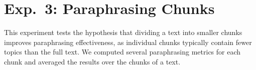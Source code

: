\section{Exp.\ 3: Paraphrasing Chunks}
\label{sec:results_chunks}

This experiment tests the hypothesis that dividing a text into smaller chunks improves paraphrasing effectiveness, as individual chunks typically contain fewer topics than the full text. 
We computed several paraphrasing metrics for each chunk and averaged the results over the chunks of a text.

\begin{table}[h]
\centering
\caption[Impact of the number of chunks on paraphrase measures.]{Impact of the number of chunks on syntactic and semantic paraphrase measures. 
Impact is reported as the absolute change between a single-chunk paraphrase and the maximum number of chunks. 
Bold values indicate the largest observed changes. 
Ideally, syntactic measures should be minimized, while semantic measures are maximized.}
\label{tab:impact_chunks_dataset_paraphraser}
\end{table}

